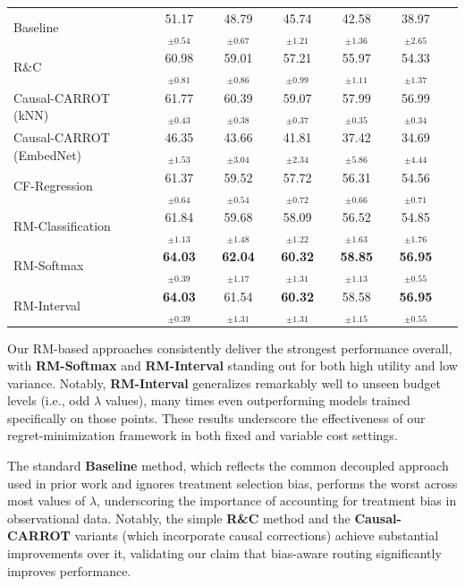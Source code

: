 \documentclass{article}
\theoremstyle{remark}
\begin{document}
\begin{table}[h]
{\begin{tabular}{lcccccc}
Baseline & 51.17$_{\pm0.54}$ & 48.79$_{\pm0.67}$ & 45.74$_{\pm1.21}$ & 42.58$_{\pm1.36}$ & 38.97$_{\pm2.65}$ & \\
R\&C & 60.98$_{\pm0.81}$ & 59.01$_{\pm0.86}$ & 57.21$_{\pm0.99}$ & 55.97$_{\pm1.11}$ & 54.33$_{\pm1.37}$ & \\
Causal-CARROT (kNN) & 61.77$_{\pm0.43}$ & 60.39$_{\pm0.38}$ & 59.07$_{\pm0.37}$ & 57.99$_{\pm0.35}$ & 56.99$_{\pm0.34}$ & \\
Causal-CARROT (EmbedNet) & 46.35$_{\pm1.53}$ & 43.66$_{\pm3.04}$ & 41.81$_{\pm2.34}$ & 37.42$_{\pm5.86}$ & 34.69$_{\pm4.44}$ & \\
CF-Regression & 61.37$_{\pm0.64}$ & 59.52$_{\pm0.54}$ & 57.72$_{\pm0.72}$ & 56.31$_{\pm0.66}$ & 54.56$_{\pm0.71}$ & \\
RM-Classification & 61.84$_{\pm1.13}$ & 59.68$_{\pm1.48}$ & 58.09$_{\pm1.22}$ & 56.52$_{\pm1.63}$ & 54.85$_{\pm1.76}$ & \\
RM-Softmax & \textbf{64.03}$_{\pm0.39}$ & \textbf{62.04}$_{\pm1.17}$ & \textbf{60.32}$_{\pm1.31}$ & \textbf{58.85}$_{\pm1.13}$ & \textbf{56.95}$_{\pm0.55}$ & \\ \hdashline
RM-Interval & \textbf{64.03}$_{\pm0.39}$ & 61.54$_{\pm1.31}$ & \textbf{60.32}$_{\pm1.31}$ & 58.58$_{\pm1.15}$ & \textbf{56.95}$_{\pm0.55}$ & \\
\bottomrule
\end{tabular}
}
\end{table}







Our RM-based approaches consistently deliver the strongest performance overall, with \textbf{RM-Softmax} and \textbf{RM-Interval} standing out for both high utility and low variance. Notably, \textbf{RM-Interval} generalizes remarkably well to unseen budget levels (i.e., odd  $\lambda$ values), many times even outperforming models trained specifically on those points. These results underscore the effectiveness of our regret-minimization framework in both fixed and variable cost settings.

The standard \textbf{Baseline} method, which reflects the common decoupled approach used in prior work and ignores treatment selection bias, performs the worst across most values of $\lambda$, underscoring the importance of accounting for treatment bias in observational data. Notably,  the simple \textbf{R\&C} method and the \textbf{Causal-CARROT} variants (which incorporate causal corrections) achieve substantial improvements over it, validating our claim that bias-aware routing significantly improves performance.
\end{document}
